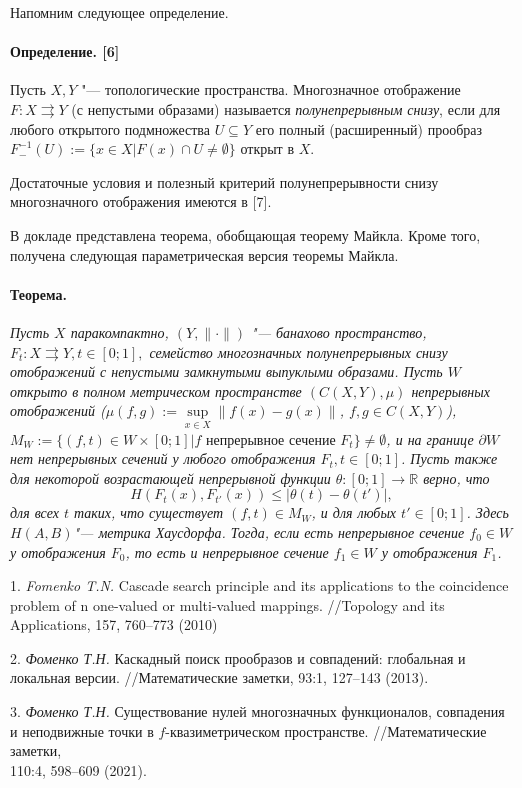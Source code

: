 Напомним следующее определение.

\paragraph{Определение. [6]} Пусть $X,Y$ "--- топологические пространства. Многозначное отображение $F: X\rightrightarrows Y$ (с непустыми образами) называется {\it полунепрерывным снизу}, если для любого открытого подмножества  $U\subseteq Y$ его полный (расширенный) прообраз $F^{-1}_{-}(U):=\{x\in X | F(x)\cap U\ne \emptyset\}$ открыт в $X$.

Достаточные условия и полезный критерий полунепрерывности снизу многозначного отображения имеются в  [7].

В докладе представлена теорема, обобщающая теорему Майкла. Кроме того, получена следующая параметрическая версия теоремы Майкла.

\paragraph{Теорема.}
{\it Пусть $X$ паракомпактно, $(Y,\|\cdot \|)$ "--- банахово пространство, $F_{t}: X\rightrightarrows Y, t\in [0;1],$ семейство многозначных полунепрерывных снизу отображений с непустыми замкнутыми выпуклыми образами. Пусть $W$  открыто в полном метрическом пространстве $(C(X,Y),\mu)$ непрерывных отображений ($\mu(f,g):=\mathop{\sup}\limits_{x\in X}\|f(x)-g(x)\|$, $f,g\in C(X,Y)$), $M_{W}:=\{(f,t)\in W\times [0;1] | f \mbox{ непрерывное сечение } F_{t}\}\ne \emptyset$, и на границе $\partial W$ нет непрерывных сечений у любого отображения $F_{t}, t\in [0;1]$. Пусть также для некоторой возрастающей непрерывной функции $\theta: [0;1]\to \mathbb R$ верно, что
$$
H(F_{t}(x),F_{t'}(x))\le|\theta(t)-\theta(t')|,
$$
для всех $t$ таких, что существует $(f,t)\in M_{W}$, и для любых $t'\in [0;1]$. Здесь $H(A,B)$"--- метрика Хаусдорфа. Тогда, если есть непрерывное сечение $f_{0}\in W$ у отображения $F_{0}$, то есть и непрерывное сечение $f_{1}\in W$ у отображения $F_{1}$.}

1.
{\it Fomenko T.N.} Cascade search principle and its applica\-ti\-ons to the
coincidence problem of n one-valued or multi-valued mappings. //Topology and its Applications, 157, 760--773 (2010)

2.
{\it Фоменко Т.Н.} Каскадный поиск прообразов и совпадений: глобальная и
локальная версии. //Математические заметки,  93:1, 127--143 (2013).

3.
{\it Фоменко Т.Н.} Существование нулей многозначных фу\-нкционалов, совпадения и неподвижные точки в $f$-ква\-зи\-мет\-ри\-чес\-ком пространстве. //Математические заметки, \\110:4, 598--609 (2021).

